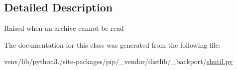 \subsection{Detailed Description}
\begin{DoxyVerb}Raised when an archive cannot be read\end{DoxyVerb}
 

The documentation for this class was generated from the following file\+:\begin{DoxyCompactItemize}
\item 
venv/lib/python3./site-\/packages/pip/\+\_\+vendor/distlib/\+\_\+backport/\hyperlink{shutil_8py}{shutil.\+py}\end{DoxyCompactItemize}
